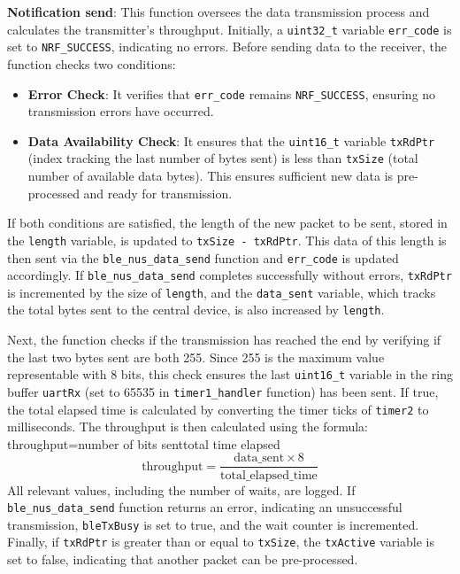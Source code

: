 \documentclass{Configuration_Files/PoliMi3i_thesis}
\begin{document}
\textbf{Notification send}:
This function oversees the data transmission process and calculates the transmitter's throughput. Initially, a \texttt{uint32\_t} variable \texttt{err\_code} is set to \texttt{NRF\_SUCCESS}, indicating no errors. Before sending data to the receiver, the function checks two conditions:

\begin{itemize}
    \item \textbf{Error Check}: It verifies that \texttt{err\_code} remains \texttt{NRF\_SUCCESS}, ensuring no transmission errors have occurred.
    \item \textbf{Data Availability Check}: It ensures that the \texttt{uint16\_t} variable \texttt{txRdPtr} (index tracking the last number of bytes sent) is less than \texttt{txSize} (total number of available data bytes). This ensures sufficient new data is pre-processed and ready for transmission.
\end{itemize}

If both conditions are satisfied, the length of the new packet to be sent, stored in the \texttt{length} variable, is updated to \texttt{txSize - txRdPtr}. This data of this length is then sent via the \texttt{ble\_nus\_data\_send} function and \texttt{err\_code} is updated accordingly. If \texttt{ble\_nus\_data\_send} completes successfully without errors, \texttt{txRdPtr} is incremented by the size of \texttt{length}, and the \texttt{data\_sent} variable, which tracks the total bytes sent to the central device, is also increased by \texttt{length}. 

Next, the function checks if the transmission has reached the end by verifying if the last two bytes sent are both 255. Since 255 is the maximum value representable with 8 bits, this check ensures the last \texttt{uint16\_t} variable in the ring buffer \texttt{uartRx} (set to 65535 in \texttt{timer1\_handler} function) has been sent. If true, the total elapsed time is calculated by converting the timer ticks of \texttt{timer2} to milliseconds. The throughput is then calculated using the formula: throughput=number of bits senttotal time elapsed
\[
\text{throughput} = \frac{\text{data\_sent} \times 8}{\text{total\_elapsed\_time}}
\]
All relevant values, including the number of waits, are logged. If \texttt{ble\_nus\_data\_send} function returns an error, indicating an unsuccessful transmission, \texttt{bleTxBusy} is set to true, and the wait counter is incremented. Finally, if \texttt{txRdPtr} is greater than or equal to \texttt{txSize}, the \texttt{txActive} variable is set to false, indicating that another packet can be pre-processed.
\end{document}
